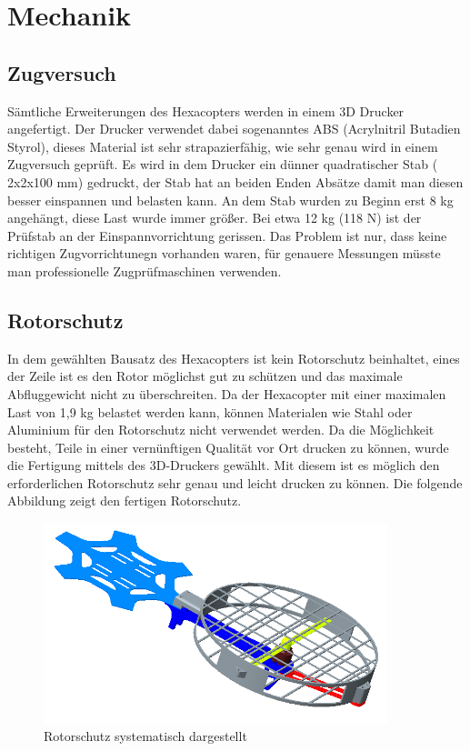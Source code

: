 \chapter{Mechanik}

\renewcommand{\kapitelautor}{Autor: Alexander Punz}

\section{Zugversuch}

Sämtliche Erweiterungen des Hexacopters werden in einem 3D Drucker angefertigt. Der Drucker verwendet dabei sogenanntes ABS (Acrylnitril Butadien Styrol), dieses Material ist sehr strapazierfähig, wie sehr genau wird in einem Zugversuch geprüft. 
Es wird in dem Drucker ein dünner quadratischer Stab ( 2x2x100 mm) gedruckt, der Stab hat an beiden Enden Absätze damit man diesen besser einspannen und belasten kann. An dem Stab wurden zu Beginn erst 8 kg angehängt, diese Last wurde immer größer.
Bei etwa 12 kg (118 N) ist der Prüfstab an der Einspannvorrichtung  gerissen. Das Problem ist nur, dass keine richtigen Zugvorrichtunegn vorhanden waren, für genauere Messungen müsste man professionelle Zugprüfmaschinen verwenden.

\section{Rotorschutz}
In dem gewählten Bausatz des Hexacopters ist kein Rotorschutz beinhaltet, eines der Zeile ist es den Rotor möglichst gut zu schützen und das maximale Abfluggewicht nicht zu überschreiten. Da der Hexacopter mit einer maximalen Last von 1,9 kg belastet werden kann, können Materialen wie Stahl oder Aluminium für den Rotorschutz nicht verwendet werden. 
Da die Möglichkeit besteht, Teile in einer vernünftigen Qualität vor Ort drucken zu können, wurde die Fertigung mittels des 3D-Druckers gewählt. Mit diesem ist es möglich den erforderlichen Rotorschutz sehr genau und leicht drucken zu können. 
Die folgende Abbildung zeigt den fertigen Rotorschutz.

\newpage

\begin{figure}[tbh]
\begin{centering}
\includegraphics[width = 100mm]{Bilder/rotorschutz_zusammenbau}
\par\end{centering}
\caption{Rotorschutz systematisch dargestellt}
\label{Rotorschutz}
\end{figure}

